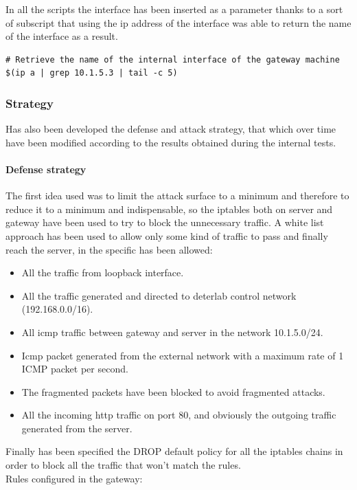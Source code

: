 \documentclass[14pt]{article}
\begin{document}
In all the scripts the interface has been inserted as a parameter thanks to a sort of subscript that using the ip address of the interface was able to return the name of the interface as a result.
\begin{Verbatim}
# Retrieve the name of the internal interface of the gateway machine
$(ip a | grep 10.1.5.3 | tail -c 5)
\end{Verbatim}

\subsubsection{Strategy}
Has also been developed the defense and attack strategy, that which over time have been modified according to the results obtained during the internal tests.

\paragraph{Defense strategy}
The first idea used was to limit the attack surface to a minimum and therefore to reduce it to a minimum and indispensable, so the iptables both on server and gateway have been used to try to block the unnecessary traffic. A white list approach has been used to allow only some kind of traffic to pass and finally reach the server, in the specific has been allowed:
\begin{itemize}
	\item All the traffic from loopback interface.
	\item All the traffic generated and directed to deterlab control network (192.168.0.0/16).
	\item All icmp traffic between gateway and server in the network 10.1.5.0/24.
	\item Icmp packet generated from the external network with a maximum rate of 1 ICMP packet per second.
	\item The fragmented packets have been blocked to avoid fragmented attacks.
	\item All the incoming http traffic on port 80, and obviously the outgoing traffic generated from the server.
\end{itemize}
Finally has been specified the DROP default policy for all the iptables chains in order to block all the traffic that won't match the rules. 
\\
Rules configured in the gateway:
\end{document}
